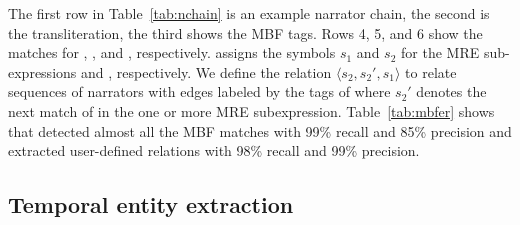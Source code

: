 The first row in Table~\ref{tab:nchain} is an example narrator chain,
the second is the transliteration, the third 
shows the MBF tags. Rows 4, 5, and 6 show the 
matches for , , and ,
respectively.
%
\framework assigns the symbols $s_1$ and $s_2$ for the 
MRE sub-expressions  and , respectively. 
We define the relation $\langle s_2,s_2',s_1\rangle$ 
to relate sequences of narrators with edges labeled by the tags of  where 
$s_2'$ denotes the next match of  in the one or more MRE subexpression.
%
Table~\ref{tab:mbfer} shows that \framework detected almost all the MBF matches 
with 99\% recall and 85\% precision and 
extracted user-defined relations with 98\% recall and 99\% precision.


\begin{table}[tb!]
  \centering
  \caption{\framework MBF and user-defined relation accuracy }
  \label{tab:mbfer}%
  \vspace{-1.5em}
\end{table}%

\vspace{-1.5em}
\subsection{Temporal entity extraction}
\vspace{-1em}

